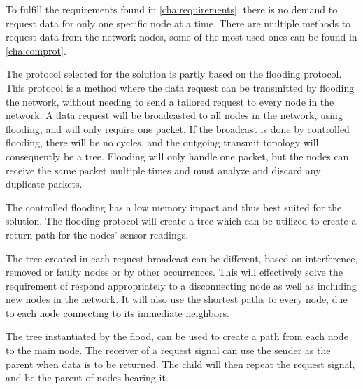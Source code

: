 To fulfill the requirements found in \ref{cha:requirements}, there is no demand to request data for only one specific node at a time.
There are multiple methods to request data from the network nodes, some of the most used ones can be found in \ref{cha:comprot}. 

The protocol selected for the solution is partly based on the flooding protocol.
This protocol is a method where the data request can be transmitted by flooding the network, without needing to send a tailored request to every node in the network. 
A data request will be broadcasted to all nodes in the network, using flooding, and will only require one packet. 
If the broadcast is done by controlled flooding, there will be no cycles, and the outgoing transmit topology will consequently be a tree. 
Flooding will only handle one packet, but the nodes can receive the same packet multiple times and must analyze and discard any duplicate packets.

The controlled flooding has a low memory impact and thus best suited for the solution. The flooding protocol will create a tree which can be utilized to create a return path for the nodes' sensor readings.

The tree created in each request broadcast can be different, based on interference, removed or faulty nodes or by other occurrences. 
This will effectively solve the requirement of respond appropriately to a disconnecting node as well as including new nodes in the network. 
It will also use the shortest paths to every node, due to each node connecting to its immediate neighbors. 

The tree instantiated by the flood, can be used to create a path from each node to the main node.
The receiver of a request signal can use the sender as the parent when data is to be returned.
The child will then repeat the request signal, and be the parent of nodes hearing it.

